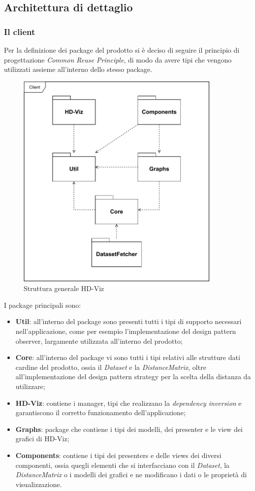 \documentclass[../manuale_sviluppatore.tex]{subfiles}
\begin{document}
\subsection{Architettura di dettaglio}
\subsubsection{Il client}

Per la definizione dei package del prodotto si è deciso di seguire il principio di progettazione 
\emph{Common Reuse Principle}, di modo da avere tipi che vengono utilizzati assieme all'interno 
dello stesso package.

\begin{figure}[H]
	\centering
	\includegraphics[width=10cm]{src/img/packageDiagramOverview.pdf}
	\caption{Struttura generale HD-Viz}
\end{figure}

I package principali sono:
\begin{itemize}
	\item \textbf{Util}: all'interno del package sono presenti tutti i tipi di supporto necessari 
	nell'applicazione, come per esempio l'implementazione del design pattern observer, largamente 
	utilizzata all'interno del prodotto;
	\item \textbf{Core}: all'interno del package vi sono tutti i tipi relativi alle strutture dati 
	cardine del prodotto, ossia il \emph{Dataset} e la \emph{DistanceMatrix}, oltre 
	all'implementazione del design pattern strategy per la scelta della distanza da utilizzare;
	\item \textbf{HD-Viz}: contiene i manager, tipi che realizzano la \emph{dependency inversion} e 
	garantiscono il corretto funzionamento dell'applicazione;
	\item \textbf{Graphs}: package che contiene i tipi dei modelli, dei presenter e le view dei 
	grafici di HD-Viz;
	\item \textbf{Components}: contiene i tipi dei presenters e delle views dei diversi componenti, 
	ossia quegli elementi che si interfacciano con il \emph{Dataset}, la \emph{DistanceMatrix} o i 
	modelli dei grafici e ne modificano i dati o le proprietà di visualizzazione.
\end{itemize}
\end{document}
